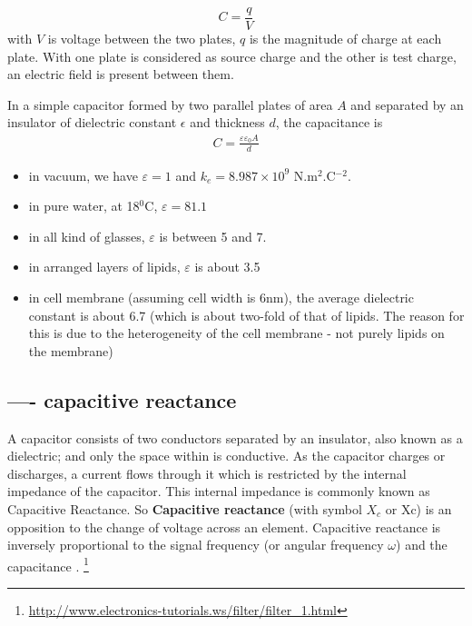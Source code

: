\begin{equation}
  C = \frac{q}{V}
\end{equation}
with $V$ is voltage between the two plates, $q$ is the magnitude of
charge at each plate. With one plate is considered as source charge
and the other is test charge, an electric field is present between
them.

In a simple capacitor formed by two parallel plates of area $A$ and
separated by an insulator of dielectric constant $\epsilon$ and
thickness $d$, the capacitance is
\begin{eqnarray}
  \label{eq:236}
  C = \frac{\varepsilon\varepsilon_0 A}{d}
\end{eqnarray}

\begin{itemize}
\label{dielectric_constant}
\item in vacuum, we have $\varepsilon=1$ and $k_e=8.987\times 10^9
 $ N.m$^2$.C$^{-2}$.
\item in pure water, at 18$^0$C, $\varepsilon=81.1$
\item in all kind of glasses, $\varepsilon$ is between 5 and 7.
\item in arranged layers of lipids, $\varepsilon$ is about 3.5
\item in cell membrane (assuming cell width is 6nm), the average
  dielectric constant is about 6.7 (which is about two-fold of that of
  lipids. The reason for this is due to the heterogeneity of the cell
  membrane - not purely lipids on the membrane)
\end{itemize}
\subsection{---- capacitive reactance}
\label{sec:capacitive-reactance}

A capacitor consists of two conductors separated by an insulator, also known as
a dielectric; and only the space within is conductive. As the capacitor charges
or discharges, a current flows through it which is restricted by the internal
impedance of the capacitor. This internal impedance is commonly known as
Capacitive Reactance. So {\bf Capacitive reactance} (with symbol $X_c$ or Xc) is
an opposition to the change of voltage across an element. Capacitive reactance
is inversely proportional to the signal frequency (or angular frequency
$\omega$) and the capacitance .
\footnote{\url{http://www.electronics-tutorials.ws/filter/filter_1.html}}

